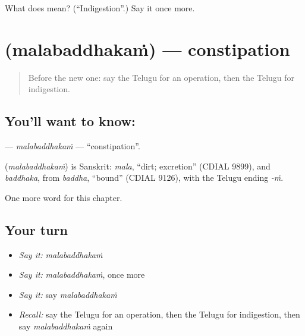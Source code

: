 \begin{tcolorbox}[breakable,colback=teal!4,colframe=teal!35!black,title={Before you move on}]
What does  mean? (\textquotedblleft{}Indigestion\textquotedblright{}.) Say it once more.
\end{tcolorbox}
\section[\texorpdfstring{\te{మలబద్ధకం} (malabaddhakaṁ)}{మలబద్ధకం (malabaddhakaṁ)}]{ (malabaddhakaṁ) — constipation}

\label{lesson:TE-C288-malabaddhakam}



\begin{quote}
Before the new one: say the Telugu for an operation, then the Telugu for indigestion.
\end{quote}

\subsection*{You'll want to know: }
\textbf{} — \emph{malabaddhakaṁ} — \textquotedblleft{}constipation\textquotedblright{}.

\begin{cousinweb}
\textbf{} (\emph{malabaddhakaṁ}) is Sanskrit: \emph{mala}, \textquotedblleft{}dirt; excretion\textquotedblright{} (CDIAL 9899), and \emph{baddhaka}, from \emph{baddha}, \textquotedblleft{}bound\textquotedblright{} (CDIAL 9126), with the Telugu ending \emph{-ṁ}.
\end{cousinweb}

\begin{grammarlens}[title={What you've built}]
One more word for this chapter.
\end{grammarlens}

\subsection*{Your turn}
\begin{itemize}
\raggedright
  \item \emph{Say it:} \emph{malabaddhakaṁ}
  \item \emph{Say it:} \emph{malabaddhakaṁ}, once more
  \item \emph{Say it:} say \emph{malabaddhakaṁ}
  \item \emph{Recall:} say the Telugu for an operation, then the Telugu for indigestion, then say \emph{malabaddhakaṁ} again
\end{itemize}

